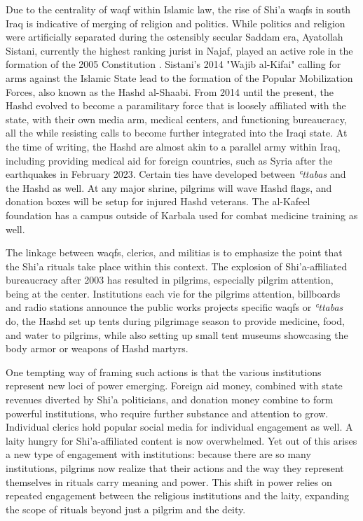 Due to the centrality of waqf within Islamic law, the rise of Shi'a waqfs in south Iraq is indicative of merging of religion and politics. While politics and religion were artificially separated during the ostensibly secular Saddam era, Ayatollah Sistani, currently the highest ranking jurist in Najaf, played an active role in the formation of the 2005 Constitution \cite[146]{nakash_reaching_2006}. Sistani's 2014 "Wajib al-Kifai" calling for arms against the Islamic State lead to the formation of the Popular Mobilization Forces, also known as the Hashd al-Shaabi. From 2014 until the present, the Hashd evolved to become a paramilitary force that is loosely affiliated with the state, with their own media arm, medical centers, and functioning bureaucracy, all the while resisting calls to become further integrated into the Iraqi state. At the time of writing, the Hashd are almost akin to a parallel army within Iraq, including providing medical aid for foreign countries, such as Syria after the earthquakes in February 2023. Certain ties have developed between \emph{ʿttabas} and the Hashd as well. At any major shrine, pilgrims will wave Hashd flags, and donation boxes will be setup for injured Hashd veterans. The al-Kafeel foundation has a campus outside of Karbala used for combat medicine training as well. 

The linkage between waqfs, clerics, and militias is to emphasize the point that the Shi'a rituals take place within this context. The explosion of Shi'a-affiliated bureaucracy after 2003 has resulted in pilgrims, especially pilgrim attention, being at the center. Institutions each vie for the pilgrims attention, billboards and radio stations announce the public works projects specific waqfs or \emph{ʿttabas} do, the Hashd set up tents during pilgrimage season to provide medicine, food, and water to pilgrims, while also setting up small tent museums showcasing the body armor or weapons of Hashd martyrs. 

One tempting way of framing such actions is that the various institutions represent new loci of power emerging. Foreign aid money, combined with state revenues diverted by Shi'a politicians, and donation money combine to form powerful institutions, who require further substance and attention to grow. Individual clerics hold popular social media \cite{ann_wainscott_engaging_2019} for individual engagement as well. A laity hungry for Shi'a-affiliated content is now overwhelmed. Yet out of this arises a new type of engagement with institutions: because there are so many institutions, pilgrims now realize that their actions and the way they represent themselves in rituals carry meaning and power. This shift in power relies on repeated engagement between the religious institutions and the laity, expanding the scope of rituals beyond just a pilgrim and the deity. 

